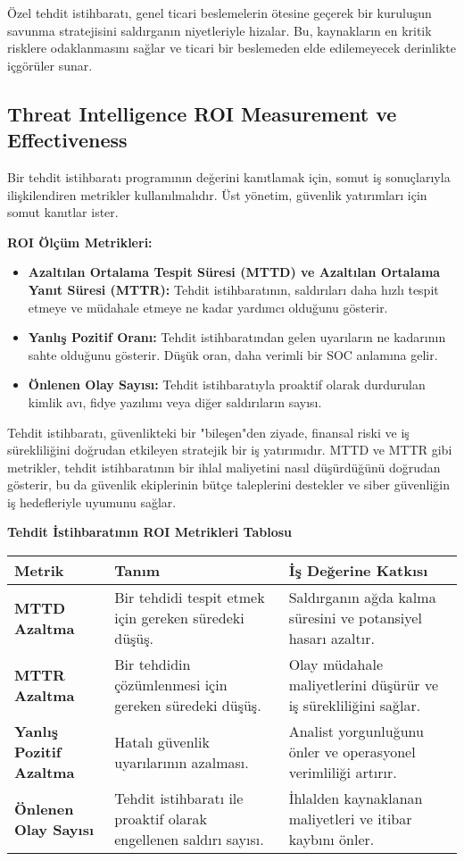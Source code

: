 Özel tehdit istihbaratı, genel ticari beslemelerin ötesine geçerek bir kuruluşun savunma stratejisini saldırganın niyetleriyle hizalar. Bu, kaynakların en kritik risklere odaklanmasını sağlar ve ticari bir beslemeden elde edilemeyecek derinlikte içgörüler sunar.

\subsection{Threat Intelligence ROI Measurement ve Effectiveness}

Bir tehdit istihbaratı programının değerini kanıtlamak için, somut iş sonuçlarıyla ilişkilendiren metrikler kullanılmalıdır. Üst yönetim, güvenlik yatırımları için somut kanıtlar ister.

\textbf{ROI Ölçüm Metrikleri:}
\begin{itemize}
    \item \textbf{Azaltılan Ortalama Tespit Süresi (MTTD) ve Azaltılan Ortalama Yanıt Süresi (MTTR):} Tehdit istihbaratının, saldırıları daha hızlı tespit etmeye ve müdahale etmeye ne kadar yardımcı olduğunu gösterir.
    \item \textbf{Yanlış Pozitif Oranı:} Tehdit istihbaratından gelen uyarıların ne kadarının sahte olduğunu gösterir. Düşük oran, daha verimli bir SOC anlamına gelir.
    \item \textbf{Önlenen Olay Sayısı:} Tehdit istihbaratıyla proaktif olarak durdurulan kimlik avı, fidye yazılımı veya diğer saldırıların sayısı.
\end{itemize}

Tehdit istihbaratı, güvenlikteki bir "bileşen"den ziyade, finansal riski ve iş sürekliliğini doğrudan etkileyen stratejik bir iş yatırımıdır. MTTD ve MTTR gibi metrikler, tehdit istihbaratının bir ihlal maliyetini nasıl düşürdüğünü doğrudan gösterir, bu da güvenlik ekiplerinin bütçe taleplerini destekler ve siber güvenliğin iş hedefleriyle uyumunu sağlar.

\textbf{Tehdit İstihbaratının ROI Metrikleri Tablosu}

\begin{tabularx}{\textwidth}{|l|X|X|}
\hline
\textbf{Metrik} & \textbf{Tanım} & \textbf{İş Değerine Katkısı} \\
\hline
\textbf{MTTD Azaltma} & Bir tehdidi tespit etmek için gereken süredeki düşüş. & Saldırganın ağda kalma süresini ve potansiyel hasarı azaltır. \\
\hline
\textbf{MTTR Azaltma} & Bir tehdidin çözümlenmesi için gereken süredeki düşüş. & Olay müdahale maliyetlerini düşürür ve iş sürekliliğini sağlar. \\
\hline
\textbf{Yanlış Pozitif Azaltma} & Hatalı güvenlik uyarılarının azalması. & Analist yorgunluğunu önler ve operasyonel verimliliği artırır. \\
\hline
\textbf{Önlenen Olay Sayısı} & Tehdit istihbaratı ile proaktif olarak engellenen saldırı sayısı. & İhlalden kaynaklanan maliyetleri ve itibar kaybını önler. \\
\hline
\end{tabularx}